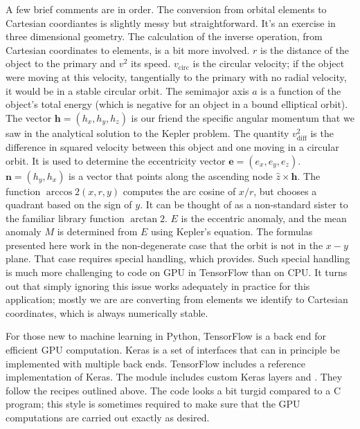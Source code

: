 A few brief comments are in order.
The conversion from orbital elements to Cartesian coordiantes is slightly messy but straightforward.
It's an exercise in three dimensional geometry.
The calculation of the inverse operation, from Cartesian coordinates to elements, is a bit more involved.
$r$ is the distance of the object to the primary and $v^2$ its speed.
$v_{\mathrm{circ}}$ is the circular velocity; if the object were moving at this velocity, 
tangentially to the primary with no radial velocity, it would be in a stable circular orbit.
The semimajor axis $a$ is a function of the object's total energy (which is negative for an object in a bound elliptical orbit).
The vector $\mathbf{h} = (h_x, h_y, h_z)$ is our friend the specific angular momentum that we saw in the analytical solution to the Kepler problem.
The quantity $v^2_{\mathrm{diff}}$ is the difference in squared velocity between this object and one moving in a circular orbit.
It is used to determine the eccentricity vector $\mathbf{e} = (e_x, e_y, e_z)$.
$\mathbf{n} = (h_y, h_x)$ is a vector that points along the ascending node $\hat{z} \times \mathbf{h}$.
The function $\arccos2(x, r, y)$ computes the arc cosine of $x / r$, but chooses a quadrant based on the sign of $y$.
It can be thought of as a non-standard sister to the familiar library function $\arctan2$.
$E$ is the eccentric anomaly, and the mean anomaly $M$ is determined from $E$ using Kepler's equation.
The formulas presented here work in the non-degenerate case that the orbit is not in the $x-y$ plane.
That case requires special handling, which  provides.
Such special handling is much more challenging to code on GPU in TensorFlow than on CPU.
It turns out that simply ignoring this issue works adequately in practice for this application;
mostly we are are converting from elements we identify to Cartesian coordinates, which is always numerically stable.

For those new to machine learning in Python, TensorFlow is a back end for efficient GPU computation.
Keras is a set of interfaces that can in principle be implemented with multiple back ends.
TensorFlow includes a reference implementation of Keras.
The module  includes custom Keras layers  and .
They follow the recipes outlined above.  
The code looks a bit turgid compared to a C program; 
this style is sometimes required to make sure that the GPU computations are carried out exactly as desired.

